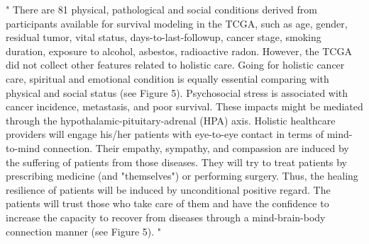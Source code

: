 \documentclass[preprint,12pt]{elsarticle}
\newenvironment{MyIndent}
{\par\leftskip1cm\relax\rightskip1cm\relax}
{\par\leftskip0cm\relax\rightskip0cm\relax}
\newenvironment{MyColorPar}[1]{%
    \leavevmode\color{#1}\ignorespaces%
}{%
}%
\begin{document}
\begin{MyColorPar}{blue}
\begin{MyIndent}
\begin{MyColorPar}{red}
" %
There are 81 physical, pathological and social conditions derived from participants available for survival modeling in the TCGA, %
such as age, gender, residual tumor, vital status, days-to-last-followup, cancer stage, smoking duration, exposure to alcohol, asbestos, radioactive radon. 
However, the TCGA did not collect other features related to holistic care.
Going for holistic cancer care\cite{Mehta2019}\cite{Iftikhar2021}, spiritual and emotional condition is equally essential comparing with physical and social status (see Figure 5).%
Psychosocial stress is associated with cancer incidence\cite{Lutgendorf2010}\cite{Powell2013}\cite{Iftikhar2021}, metastasis\cite{Lutgendorf2010}\cite{Moreno-Smith2010}\cite{Du2020}\cite{Xu2021}, and poor survival\cite{Chida2008}.
These impacts might be mediated through the hypothalamic-pituitary-adrenal (HPA) axis\cite{Hsiao2012}.
Holistic healthcare providers will engage his/her patients with eye-to-eye contact in terms of mind-to-mind connection. Their empathy, sympathy, and compassion are induced by the suffering of patients from those diseases. They will try to treat patients by prescribing medicine (and "themselves") or performing surgery.
Thus, the healing resilience of patients will be induced by unconditional positive regard. %
The patients will trust those who take care of them and have the confidence to increase the capacity to recover from diseases through a mind-brain-body connection manner (see Figure 5).%
"
\end{MyColorPar} %
\end{MyIndent}



\end{MyColorPar}
\end{document}
